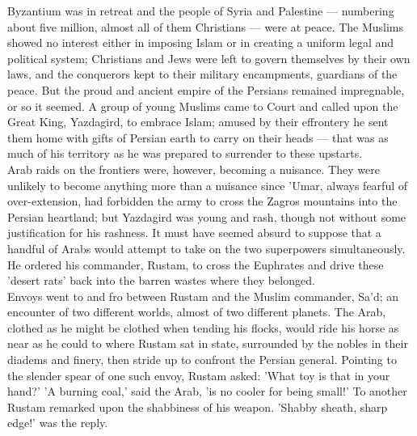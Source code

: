 \documentclass[10pt, twoside]{book}
\begin{document}
Byzantium was in retreat and the people of Syria and Palestine --- numbering about five million, almost all of them Christians --- were at peace. The Muslims showed no interest either in imposing Islam or in creating a uniform legal and political system; Christians and Jews were left to govern themselves by their own laws, and the conquerors kept to their military encampments, guardians of the peace. But the proud and ancient empire of the Persians remained impregnable, or so it seemed. A group of young Muslims came to Court and called upon the Great King, Yazdagird, to embrace Islam; amused by their effrontery he sent them home with gifts of Persian earth to carry on their heads --- that was as much of his territory as he was prepared to surrender to these upstarts. \\

Arab raids on the frontiers were, however, becoming a nuisance. They were unlikely to become anything more than a nuisance since 'Umar, always fearful of over\hyp{}extension, had forbidden the army to cross the Zagros mountains into the Persian heartland; but Yazdagird was young and rash, though not without some justification for his rashness. It must have seemed absurd to suppose that a handful of Arabs would attempt to take on the two superpowers simultaneously. He ordered his commander, Rustam, to cross the Euphrates and drive these 'desert rats' back into the barren wastes where they belonged. \\

Envoys went to and fro between Rustam and the Muslim commander, Sa'd; an encounter of two different worlds, almost of two different planets. The Arab, clothed as he might be clothed when tending his flocks, would ride his horse as near as he could to where Rustam sat in state, surrounded by the nobles in their diadems and finery, then stride up to confront the Persian general. Pointing to the slender spear of one such envoy, Rustam asked: 'What toy is that in your hand?' 'A burning coal,' said the Arab, 'is no cooler for being small!' To another Rustam remarked upon the shabbiness of his weapon. 'Shabby sheath, sharp edge!' was the reply. \\
\end{document}
